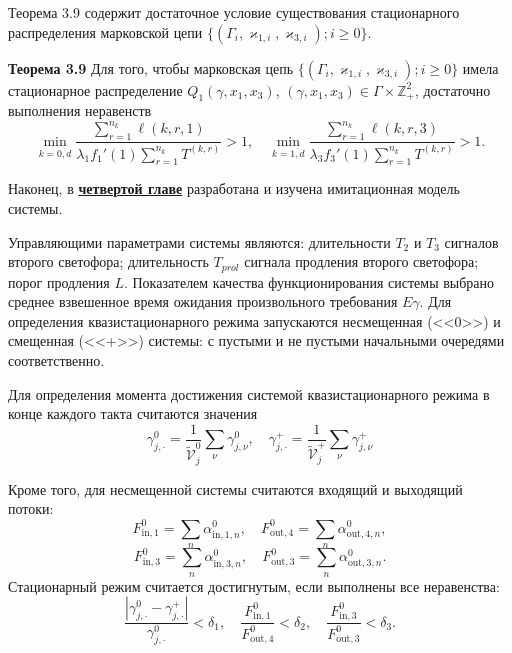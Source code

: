 \documentclass[14pt]{extarticle}
\theoremstyle{theorem}
\theoremstyle{remark}
\begin{document}
Теорема 3.9 содержит достаточное условие существования стационарного распределения марковской цепи  $\{(\Gamma_i, \varkappa_{1,i},\varkappa_{3,i}); i \geqslant 0\}$.

 {\bf Теорема 3.9}
{
Для того, чтобы марковская цепь $\{(\Gamma_i, \varkappa_{1,i},\varkappa_{3,i}); i \geqslant 0\}$ имела стационарное распределение $Q_1(\gamma,x_1,x_3)$, $(\gamma,x_1,x_3)\in \Gamma \times {\mathbb Z}^2_+$, достаточно выполнения неравенств
\begin{equation}
\min_{k=\overline{0,d}} { \frac{\sum_{r = 1}^{n_k} \ell(k,r,1) }{\lambda_1 f_1'(1) \sum_{r=1}^{n_k} T^{(k,r)} }}>1, \quad 
\min_{k=\overline{1,d}} { \frac{\sum_{r = 1}^{n_k} \ell(k,r,3) }{\lambda_3 f_3'(1) \sum_{r=1}^{n_k} T^{(k,r)} }}>1.
\label{sufficient:double}
\end{equation}
}

Наконец, в \underline{\textbf{четвертой главе}} разработана и изучена имитационная модель системы. 

Управляющими параметрами системы являются:
         длительности $T_2$ и $T_3$ сигналов второго светофора;
         длительность $T_{prol}$ сигнала продления второго светофора;
         порог продления $L$.
Показателем качества функционирования системы выбрано среднее взвешенное время ожидания произвольного требования $E \gamma$. Для определения квазистационарного режима запускаются несмещенная (<<0>>) и смещенная (<<+>>) системы: с пустыми и не пустыми начальными очередями соответственно. 

Для определения момента достижения системой квазистационарного режима 
    в конце каждого такта считаются значения
\begin{equation}
   \gamma_{j,\cdot}^0 = \frac{1}{\tilde{\mathcal{V}}_j^0}\sum_{\nu} \gamma_{j,\nu}^0, \quad \gamma_{j,\cdot}^+ = \frac{1}{\tilde{\mathcal{V}}_j^+}\sum_{\nu} \gamma_{j,\nu}^+ 
\end{equation}

Кроме того, для несмещенной системы  считаются входящий и выходящий потоки:
\begin{equation}
    F^{0}_{\text{in},1} = \sum_n \alpha^{0}_{\text{in},1,n}, \quad 
    F^{0}_{\text{out},4} = \sum_n \alpha^{0}_{\text{out},4,n},
\end{equation}
\begin{equation}
    F^{0}_{\text{in},3} = \sum_n \alpha^{0}_{\text{in},3,n}, \quad 
    F^{0}_{\text{out},3} = \sum_n \alpha^{0}_{\text{out},3,n}.
\end{equation}
Стационарный режим считается достигнутым, если выполнены все неравенства:
\begin{equation}
    \frac{|\gamma_{j,\cdot}^0 - \gamma_{j,\cdot}^+|}{\gamma_{j,\cdot}^0} < \delta_1, \quad
    \frac{F^{0}_{\text{in},1}}{F^{0}_{\text{out},4}} < \delta_2, \quad 
    \frac{F^{0}_{\text{in},3}}{F^{0}_{\text{out},3}} < \delta_3.
\end{equation}
\end{document}
